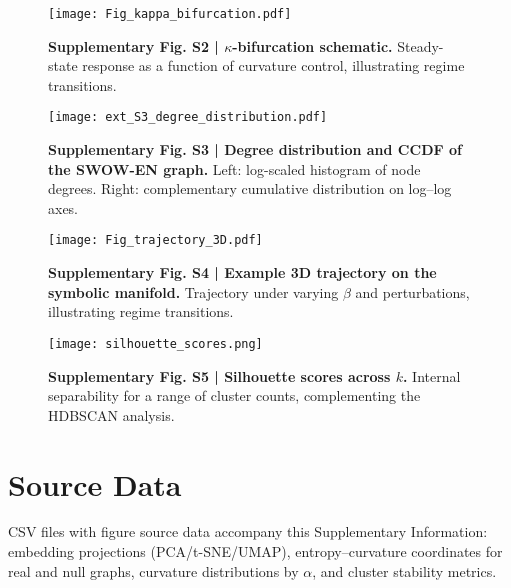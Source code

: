 \documentclass[10pt]{article}
\begin{document}
\begin{figure}[H]\centering
\texttt{[image: Fig\_kappa\_bifurcation.pdf]}
\caption{\textbf{Supplementary Fig. S2 | $\kappa$-bifurcation schematic.} Steady-state response as a function of curvature control, illustrating regime transitions.}
\end{figure}

\begin{figure}[H]\centering
\texttt{[image: ext\_S3\_degree\_distribution.pdf]}
\caption{\textbf{Supplementary Fig. S3 | Degree distribution and CCDF of the SWOW-EN graph.} Left: log-scaled histogram of node degrees. Right: complementary cumulative distribution on log--log axes.}
\end{figure}

\begin{figure}[H]\centering
\texttt{[image: Fig\_trajectory\_3D.pdf]}
\caption{\textbf{Supplementary Fig. S4 | Example 3D trajectory on the symbolic manifold.} Trajectory under varying $\beta$ and perturbations, illustrating regime transitions.}
\end{figure}

\begin{figure}[H]\centering
\texttt{[image: silhouette\_scores.png]}
\caption{\textbf{Supplementary Fig. S5 | Silhouette scores across $k$.} Internal separability for a range of cluster counts, complementing the HDBSCAN analysis.}
\end{figure}

\section*{Source Data}
CSV files with figure source data accompany this Supplementary Information: embedding projections (PCA/t-SNE/UMAP), entropy--curvature coordinates for real and null graphs, curvature distributions by $\alpha$, and cluster stability metrics.
\end{document}

